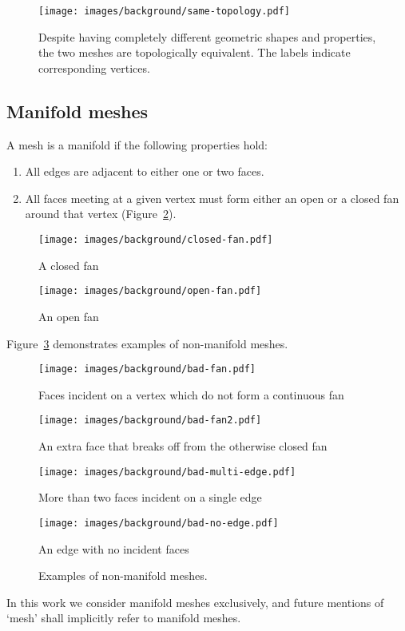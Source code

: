 \begin{figure}
    \texttt{[image: images/background/same-topology.pdf]}
    \caption{Despite having completely different geometric shapes and properties, the two meshes are topologically equivalent. The labels indicate corresponding vertices.}
    \label{fig:same-topology}
\end{figure}




\subsection{Manifold meshes}
A mesh is a manifold if the following properties hold:
\begin{enumerate}
\item All edges are adjacent to either one or two faces.

\item All faces meeting at a given vertex must form either an open or a closed fan around that vertex (Figure~\ref{fig:open-closed-fans}).
\end{enumerate}

\begin{figure}
    \sidebyside
        {\texttt{[image: images/background/closed-fan.pdf]}
        \caption{A closed fan}}
        {\texttt{[image: images/background/open-fan.pdf]}
        \caption{An open fan}}
    \caption{}
    \label{fig:open-closed-fans}
\end{figure}

Figure~\ref{fig:non-manifolds} demonstrates examples of non-manifold meshes.

\begin{figure}
    \sidebysidefour
    {\texttt{[image: images/background/bad-fan.pdf]}
        \caption{Faces incident on a vertex which do not form a continuous fan}}
    {\texttt{[image: images/background/bad-fan2.pdf]}
        \caption{An extra face that breaks off from the otherwise closed fan}}
    {\texttt{[image: images/background/bad-multi-edge.pdf]}
        \caption{More than two faces incident on a single edge}}
    {\texttt{[image: images/background/bad-no-edge.pdf]}
        \caption{An edge with no incident faces}}

    \caption{Examples of non-manifold meshes.}
    \label{fig:non-manifolds}
\end{figure}

In this work we consider manifold meshes exclusively, and future mentions of `mesh' shall implicitly refer to manifold meshes.




